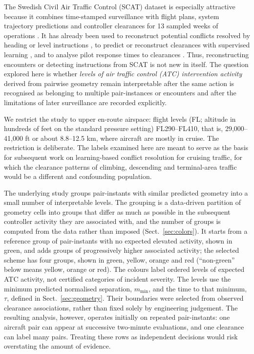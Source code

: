 \documentclass[pdflatex,sn-mathphys-num]{sn-jnl}
\newcommand{\mmin}{m_{\min}}
\begin{document}
The Swedish Civil Air Traffic Control (SCAT) dataset is especially attractive because it combines time-stamped surveillance with flight plans, system trajectory predictions and controller clearances for 13 sampled weeks of operations \cite{nilsson2023}. It has already been used to reconstruct potential conflicts resolved by heading or level instructions \cite{renkhoff2025}, to predict or reconstruct clearances with supervised learning \cite{renkhoff2026}, and to analyse pilot response times to clearances \cite{wustenbecker2025}. Thus, reconstructing encounters or detecting instructions from SCAT is not new in itself. The question explored here is whether \emph{levels of air traffic control (ATC) intervention activity} derived from pairwise geometry remain interpretable after the same action is recognised as belonging to multiple pair-instances or encounters and after the limitations of later surveillance are recorded explicitly.

We restrict the study to upper en-route airspace: flight levels (FL; altitude in hundreds of feet on the standard pressure setting) FL290--FL410, that is, 29,000--41,000 ft or about 8.8--12.5 km, where aircraft are mostly in cruise. The restriction is deliberate. The labels examined here are meant to serve as the basis for subsequent work on learning-based conflict resolution for cruising traffic, for which the clearance patterns of climbing, descending and terminal-area traffic would be a different and confounding population.

The underlying study groups pair-instants with similar predicted geometry into a small number of interpretable levels. The grouping is a data-driven partition of geometry cells into groups that differ as much as possible in the subsequent controller activity they are associated with, and the number of groups is computed from the data rather than imposed (Sect.~\ref{sec:colors}). It starts from a reference group of pair-instants with no expected elevated activity, shown in green, and adds groups of progressively higher associated activity; the selected scheme has four groups, shown in green, yellow, orange and red (``non-green'' below means yellow, orange or red). The colours label ordered levels of expected ATC activity, not certified categories of incident severity. The levels use the minimum predicted normalised separation, $\mmin$, and the time to that minimum, $\tau$, defined in Sect.~\ref{sec:geometry}. Their boundaries were selected from observed clearance associations, rather than fixed solely by engineering judgement. The resulting analysis, however, operates initially on repeated pair-instants: one aircraft pair can appear at successive two-minute evaluations, and one clearance can label many pairs. Treating these rows as independent decisions would risk overstating the amount of evidence.
\end{document}
